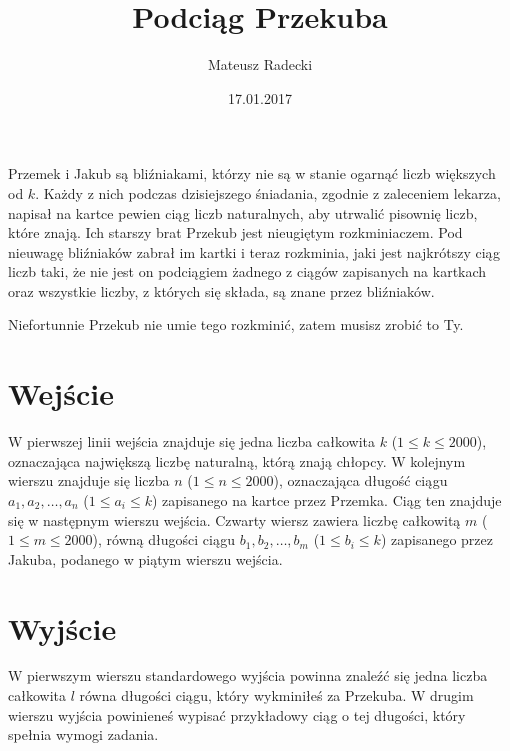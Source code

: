 \documentclass[zad,zawodnik,utf8]{sinol}
\title{Podciąg Przekuba}
\author{Mateusz Radecki} %
\date{17.01.2017}
\begin{document}
\begin{tasktext}%
    
    Przemek i Jakub są bliźniakami, którzy nie są w stanie ogarnąć liczb większych od $k$. Każdy z nich podczas dzisiejszego śniadania, zgodnie z zaleceniem lekarza,
    napisał na kartce pewien ciąg liczb naturalnych, aby utrwalić pisownię liczb, które znają. Ich starszy brat Przekub jest nieugiętym rozkminiaczem.
    Pod nieuwagę bliźniaków zabrał im kartki i teraz rozkminia, jaki jest najkrótszy ciąg liczb taki, że nie jest on podciągiem 
    żadnego z ciągów zapisanych na kartkach oraz wszystkie liczby, z których się składa, są znane przez bliźniaków.
    
    Niefortunnie Przekub nie umie tego rozkminić, zatem musisz zrobić to Ty.

  \section{Wejście}

  W pierwszej linii wejścia znajduje się jedna liczba całkowita $k$ ($1 \leq k \leq 2000$), oznaczająca największą liczbę naturalną, którą znają chłopcy. W kolejnym wierszu znajduje się liczba
  $n$ ($1 \leq n \leq 2000$), oznaczająca długość ciągu $a_1, a_2, \dots, a_n$ ($1 \leq a_i \leq k$) zapisanego na kartce przez Przemka. Ciąg ten znajduje się w następnym wierszu wejścia. 
  Czwarty wiersz zawiera liczbę całkowitą $m$ ($1 \leq m \leq 2000$), równą długości ciągu $b_1, b_2, \dots, b_m$ ($1 \leq b_i \leq k$) zapisanego przez Jakuba, podanego w piątym
  wierszu wejścia.

  \section{Wyjście}
   
   W pierwszym wierszu standardowego wyjścia powinna znaleźć się jedna liczba całkowita $l$ równa długości ciągu, który wykminiłeś za Przekuba. 
   W drugim wierszu wyjścia powinieneś wypisać przykładowy ciąg o tej długości, który spełnia wymogi zadania.
  
\makecompactexample

\end{tasktext}
\end{document}
